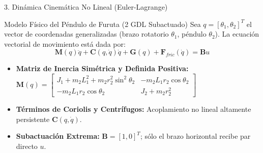 \documentclass[10pt,aspectratio=169]{beamer}
\begin{document}
\begin{frame}{3. Dinámica Cinemática No Lineal (Euler-Lagrange)}
  \begin{block}{Modelo Físico del Péndulo de Furuta (2 GDL Subactuado)}
    Sea $q = [\theta_1, \theta_2]^T$ el vector de coordenadas generalizadas (brazo rotatorio $\theta_1$, péndulo $\theta_2$). La ecuación vectorial de movimiento está dada por:
    \begin{equation*}
      \mathbf{M}(q)\ddot{q} + \mathbf{C}(q,\dot{q})\dot{q} + \mathbf{G}(q) + \mathbf{F}_{fric}(\dot{q}) = \mathbf{B} u
    \end{equation*}
  \end{block}
  
  \vspace{0.1cm}
  \begin{itemize}
    \item \textbf{Matriz de Inercia Simétrica y Definida Positiva:} 
    $\mathbf{M}(q) = \begin{bmatrix} J_1 + m_2 L_1^2 + m_2 r_2^2 \sin^2\theta_2 & -m_2 L_1 r_2 \cos\theta_2 \\ -m_2 L_1 r_2 \cos\theta_2 & J_2 + m_2 r_2^2 \end{bmatrix}$
    \item \textbf{Términos de Coriolis y Centrífugos:} Acoplamiento no lineal altamente persistente $\mathbf{C}(q, \dot{q})$.
    \item \textbf{Subactuación Extrema:} $\mathbf{B} = [1, 0]^T$; sólo el brazo horizontal recibe par directo $u$.
  \end{itemize}
\end{frame}
\end{document}
